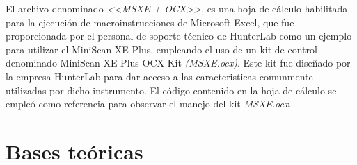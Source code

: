 			El archivo denominado \textit{<<MSXE + OCX>>}, es una hoja de c\'{a}lculo habilitada para la ejecuci\'{o}n de macroinstrucciones de Microsoft Excel, que fue proporcionada por el personal de soporte t\'{e}cnico de HunterLab como un ejemplo para utilizar el MiniScan XE Plus, empleando el uso de un kit de control denominado MiniScan XE Plus OCX Kit \textit{(MSXE.ocx)}. Este kit fue dise\~{n}ado por la empresa HunterLab para dar acceso a las caracteristicas comunmente utilizadas por dicho instrumento. El c\'{o}digo contenido en la hoja de c\'{a}lculo se emple\'{o} como referencia para observar el manejo del kit \textit{MSXE.ocx}.

	\section{Bases te\'{o}ricas}